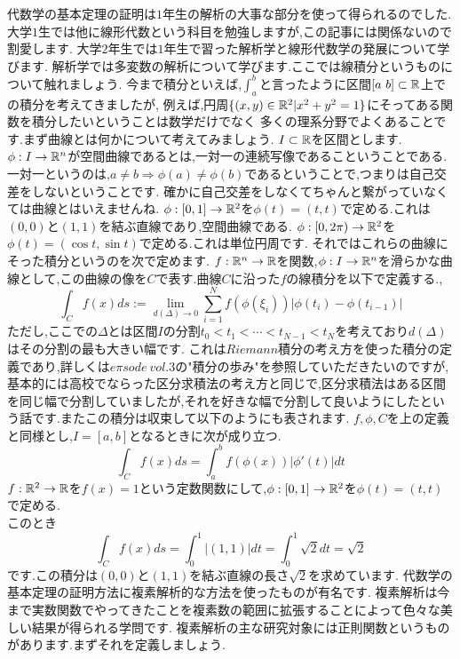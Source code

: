 代数学の基本定理の証明は$1$年生の解析の大事な部分を使って得られるのでした.
大学$1$生では他に線形代数という科目を勉強しますが,この記事には関係ないので割愛します.
大学$2$年生では$1$年生で習った解析学と線形代数学の発展について学びます.
解析学では多変数の解析について学びます.ここでは線積分というものについて触れましょう.
今まで積分といえば,$\int_a^b$と言ったように区間$[a\ b]\subset \mathbb R$上での積分を考えてきましたが,
例えば,円周$\{(x,y)\in\mathbb R^2 | x^2+y^2=1\}$にそってある関数を積分したいということは数学だけでなく
多くの理系分野でよくあることです.まず曲線とは何かについて考えてみましょう.
$I\subset\mathbb R$を区間とします.$\phi:I \to \mathbb R^n$が空間曲線であるとは,一対一の連続写像であるこということである.
一対一というのは,$a\neq b \Rightarrow \phi(a) \neq \phi(b)$であるということで,つまりは自己交差をしないということです.
確かに自己交差をしなくてちゃんと繋がっていなくては曲線とはいえませんね.
\ex
$\phi:[0,1] \to \mathbb R^2$を$\phi(t)=(t,t)$で定める.これは$(0,0)$と$(1,1)$を結ぶ直線であり,空間曲線である.
\exx
\ex
$\phi:[0,2\pi) \to \mathbb R^2$を$\phi(t)=(\cos t ,\sin t)$で定める.これは単位円周です.
\exx
それではこれらの曲線にそった積分というのを次で定めます.
$f:\mathbb R^n \to \mathbb R$を関数,$\phi:I\to\mathbb R^n$を滑らかな曲線として,この曲線の像を$C$で表す.曲線$C$に沿った$f$の線積分を以下で定義する.,
\[
\int_C f(x)ds := \lim_{d(\Delta)\to 0} \sum_{i=1}^N f(\phi(\xi_i)) |\phi(t_i) - \phi(t_{i-1})|
\]
ただし,ここでの$\Delta$とは区間$I$の分割$t_0 < t_1 < \cdots < t_{N-1} < t_N$を考えており$d(\Delta)$はその分割の最も大きい幅です.
これは$Riemann$積分の考え方を使った積分の定義であり,詳しくは$e\pi sode\ vol.3$の"積分の歩み"を参照していただきたいのですが,
基本的には高校でならった区分求積法の考え方と同じで,区分求積法はある区間を同じ幅で分割していましたが,それを好きな幅で分割して良いようにしたという話です.またこの積分は収束して以下のようにも表されます.
\prop
$f,\phi,C$を上の定義と同様とし,$I=[a,b]$となるときに次が成り立つ.
\[
\int_C f(x) ds = \int_a^b f(\phi(x))|\phi'(t)|dt
\]
\propx
\ex
$f:\mathbb R^2\to\mathbb R$を$f(x)=1$という定数関数にして,$\phi:[0,1] \to \mathbb R^2$を$\phi(t)=(t,t)$で定める.\\
このとき
\[
\int_C f(x) ds = \int_0^1 |(1,1)| dt = \int_0^1 \sqrt{2}  dt  = \sqrt{2}
\]
です.この積分は$(0,0)$と$(1,1)$を結ぶ直線の長さ$\sqrt{2}$を求めています.
\exx
{}
代数学の基本定理の証明方法に複素解析的な方法を使ったものが有名です.
複素解析は今まで実数関数でやってきたことを複素数の範囲に拡張することによって色々な美しい結果が得られる学問です.
複素解析の主な研究対象には正則関数というものがあります.まずそれを定義しましょう.
